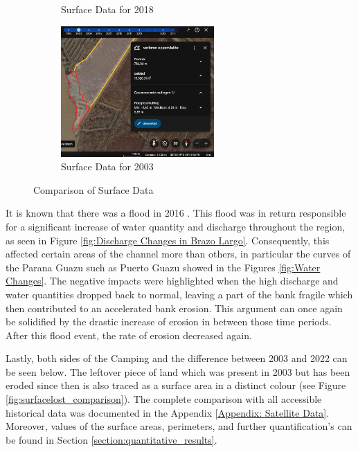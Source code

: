 \begin{figure}[H]
\begin{subfigure}[b]{0.45\textwidth}
        \caption{Surface Data for 2018}
        \label{fig:surface2018}
    \end{subfigure}
    \hfill
    \begin{subfigure}[b]{0.45\textwidth} %
        \includegraphics[width=\linewidth, height=5cm]{figures/appendix-g/verlorenopp2003.png}
        \caption{Surface Data for 2003}
        \label{fig:surface2003.2}
    \end{subfigure}
    \caption{Comparison of Surface Data}
    \label{fig:surface_comparison}
\end{figure}

It is known that there was a flood in 2016 \autocite{equipodemanejodeinformacionArgentinaInundaciones2016}. This flood was in return responsible for a significant increase of water quantity and discharge throughout the region, as seen in Figure \ref{fig:Discharge Changes in Brazo Largo}. Consequently, this affected certain areas of the channel more than others, in particular the curves of the Parana Guazu such as Puerto Guazu showed in the Figures \ref{fig:Water Changes}. The negative impacts were highlighted when the high discharge and water quantities dropped back to normal, leaving a part of the bank fragile which then contributed to an accelerated bank erosion. This argument can once again be solidified by the drastic increase of erosion in between those time periods. After this flood event, the rate of erosion decreased again.

Lastly, both sides of the Camping and the difference between 2003 and 2022 can be seen below. The leftover piece of land which was present in 2003 but has been eroded since then is also traced as a surface area in a distinct colour (see Figure \ref{fig:surfacelost_comparison}). The complete comparison with all accessible historical data was documented in the Appendix \ref{Appendix: Satellite Data}. Moreover, values of the surface areas, perimeters, and further quantification's can be found in Section \ref{section:quantitative_results}.

